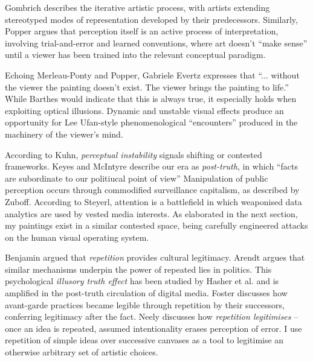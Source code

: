 \documentclass[12pt]{article}
\begin{document}
Gombrich describes the iterative artistic process, with artists
extending stereotyped modes of representation developed by their
predecessors.\autocite[Chapters II, V]{gombrich1960art} Similarly, Popper
argues that perception itself is an active process of interpretation,
involving trial-and-error and learned conventions, where art doesn't
``make sense'' until a viewer has been trained into the relevant
conceptual paradigm.\autocite[Chapter 2]{popper1972objective}

Echoing Merleau-Ponty\autocite{merleauPonty1962phenomenology} and
Popper,\autocite{popper1972objective} Gabriele Evertz expresses that
``... without the viewer the painting doesn't exist. The viewer brings
the painting to life.''\autocite{evertz09documentary} While Barthes
would indicate that this is always true,\autocite{barthes1977death} it
especially holds when exploiting optical illusions. Dynamic and
unstable visual effects produce an opportunity for Lee Ufan-style
phenomenological ``encounters''\autocite[pp.~52--6]{encounter} produced in
the machinery of the viewer's mind.

According to Kuhn, \emph{perceptual instability} signals shifting or
contested frameworks.\autocite[p.~64]{kuhn1970structure}
Keyes\autocite{keyes2004posttruth} and
McIntyre\autocite{mcintyre2018posttruth} describe our era as
\emph{post-truth}, in which ``facts are subordinate to our politiucal point of view''\autocite[p.~11]{mcintyre2018posttruth} Manipulation of public perception occurs through
commodified surveillance capitalism, as described by
Zuboff.\autocite[pp.~8--12]{zuboff2019surveillance} According to
Steyerl,\autocite{steyerl2016sea} attention is a battlefield in which
weaponised data analytics are used by vested media interests. As
elaborated in the next section, my paintings exist in a similar
contested space, being carefully engineered attacks on the human visual
operating system.

Benjamin argued that \emph{repetition} provides cultural
legitimacy.\autocite{benjamin1935kunstwerk} Arendt argues that similar
mechanisms underpin the power of repeated lies in
politics.\autocite{arendt1972lying} This psychological \emph{illusory
  truth effect} has been studied by Hasher et
al.\autocite{hasher1977frequency} and is amplified in the
post-truth\autocite{keyes2004posttruth,mcintyre2018posttruth} circulation
of digital
media.\autocite{zuboff2019surveillance} Foster\autocite[pp.~29--30]{foster1996return}
discusses how avant-garde practices became legible through repetition
by their successors, conferring legitimacy after the fact. Neely
discusses how \emph{repetition legitimises} -- once an idea is repeated,
assumed intentionality erases perception of
error.\autocite{neely-repetition} I use repetition of simple ideas over
successive canvases as a tool to legitimise an otherwise arbitrary set
of artistic choices.
\end{document}
